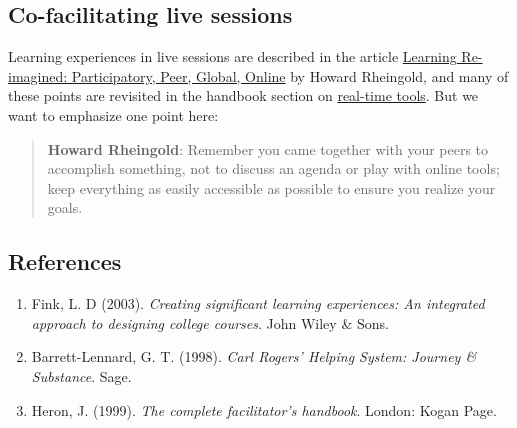 \subsection{Co-facilitating live sessions}

Learning experiences in live sessions are described in the article
\href{http://dmlcentral.net/blog/howard-rheingold/learning-reimagined-participatory-peer-global-online}{Learning
Re-imagined: Participatory, Peer, Global, Online} by Howard Rheingold,
and many of these points are revisited in the handbook section on
\href{http://peeragogy.org/real-time-meetings/}{real-time tools}. But we
want to emphasize one point here:

\begin{quote}
\textbf{Howard Rheingold}: Remember you came together
  with your peers to accomplish something, not to discuss an agenda or
  play with online tools; keep everything as easily accessible as
  possible to ensure you realize your goals.
\end{quote}

\subsection{References}

\begin{enumerate}
\item
  Fink, L. D (2003). \emph{Creating significant learning experiences: An
  integrated approach to designing college courses}. John Wiley \& Sons.
\item
  Barrett-Lennard, G. T. (1998). \emph{Carl Rogers' Helping System:
  Journey \& Substance}. Sage.
\item
  Heron, J. (1999). \emph{The complete facilitator's handbook}. London:
  Kogan Page.
\end{enumerate}
